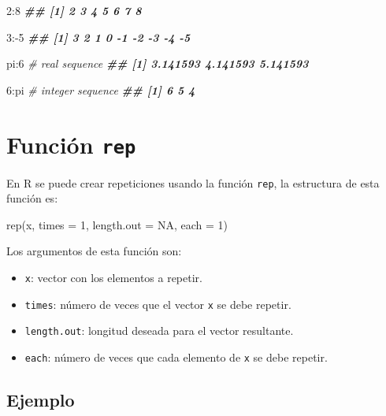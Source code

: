 \documentclass[
]{book}
\newenvironment{Shaded}{\begin{snugshade}}{\end{snugshade}}
\newcommand{\AttributeTok}[1]{\textcolor[rgb]{0.77,0.63,0.00}{#1}}
\newcommand{\CommentTok}[1]{\textcolor[rgb]{0.56,0.35,0.01}{\textit{#1}}}
\newcommand{\ConstantTok}[1]{\textcolor[rgb]{0.00,0.00,0.00}{#1}}
\newcommand{\DecValTok}[1]{\textcolor[rgb]{0.00,0.00,0.81}{#1}}
\newcommand{\DocumentationTok}[1]{\textcolor[rgb]{0.56,0.35,0.01}{\textbf{\textit{#1}}}}
\newcommand{\FunctionTok}[1]{\textcolor[rgb]{0.00,0.00,0.00}{#1}}
\newcommand{\NormalTok}[1]{#1}
\newcommand{\SpecialCharTok}[1]{\textcolor[rgb]{0.00,0.00,0.00}{#1}}
\providecommand{\tightlist}{%
  \setlength{\itemsep}{0pt}\setlength{\parskip}{0pt}}
\begin{document}
\begin{Shaded}
\begin{Highlighting}[]
\DecValTok{2}\SpecialCharTok{:}\DecValTok{8}
\DocumentationTok{\#\# [1] 2 3 4 5 6 7 8}

\DecValTok{3}\SpecialCharTok{:{-}}\DecValTok{5}
\DocumentationTok{\#\# [1]  3  2  1  0 {-}1 {-}2 {-}3 {-}4 {-}5}

\NormalTok{pi}\SpecialCharTok{:}\DecValTok{6}  \CommentTok{\# real sequence}
\DocumentationTok{\#\# [1] 3.141593 4.141593 5.141593}

\DecValTok{6}\SpecialCharTok{:}\NormalTok{pi  }\CommentTok{\# integer sequence}
\DocumentationTok{\#\# [1] 6 5 4}
\end{Highlighting}
\end{Shaded}

\hypertarget{funciuxf3n-rep}{%
\section{\texorpdfstring{Función \texttt{rep}}{Función rep}}\label{funciuxf3n-rep}}

En R se puede crear repeticiones usando la función \texttt{rep}, la estructura de esta función es:

\begin{Shaded}
\begin{Highlighting}[]
\FunctionTok{rep}\NormalTok{(x, }\AttributeTok{times =} \DecValTok{1}\NormalTok{, }\AttributeTok{length.out =} \ConstantTok{NA}\NormalTok{, }\AttributeTok{each =} \DecValTok{1}\NormalTok{)}
\end{Highlighting}
\end{Shaded}

Los argumentos de esta función son:

\begin{itemize}
\tightlist
\item
  \texttt{x}: vector con los elementos a repetir.
\item
  \texttt{times}: número de veces que el vector \texttt{x} se debe repetir.
\item
  \texttt{length.out}: longitud deseada para el vector resultante.
\item
  \texttt{each}: número de veces que cada elemento de \texttt{x} se debe repetir.
\end{itemize}

\hypertarget{ejemplo-11}{%
\subsection*{Ejemplo}\label{ejemplo-11}}
\end{document}
